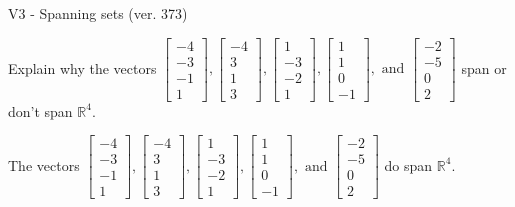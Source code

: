 \begin{exercise}
  \begin{exerciseTitle}V3 - Spanning sets (ver. 373)\end{exerciseTitle}
  \begin{exerciseStatement}
    Explain why the vectors \(\left[\begin{array}{r}
-4 \\
-3 \\
-1 \\
1
\end{array}\right] , \left[\begin{array}{r}
-4 \\
3 \\
1 \\
3
\end{array}\right] , \left[\begin{array}{r}
1 \\
-3 \\
-2 \\
1
\end{array}\right] , \left[\begin{array}{r}
1 \\
1 \\
0 \\
-1
\end{array}\right] , \text{ and } \left[\begin{array}{r}
-2 \\
-5 \\
0 \\
2
\end{array}\right]\) span or don't span \(\mathbb{R}^4\). 
	


  \end{exerciseStatement}
  \begin{exerciseAnswer}
   The vectors \(\left[\begin{array}{r}
-4 \\
-3 \\
-1 \\
1
\end{array}\right] , \left[\begin{array}{r}
-4 \\
3 \\
1 \\
3
\end{array}\right] , \left[\begin{array}{r}
1 \\
-3 \\
-2 \\
1
\end{array}\right] , \left[\begin{array}{r}
1 \\
1 \\
0 \\
-1
\end{array}\right] , \text{ and } \left[\begin{array}{r}
-2 \\
-5 \\
0 \\
2
\end{array}\right]\) 
  	 do  
	span \(\mathbb{R}^4\).
  



\end{exerciseAnswer}
\end{exercise}
